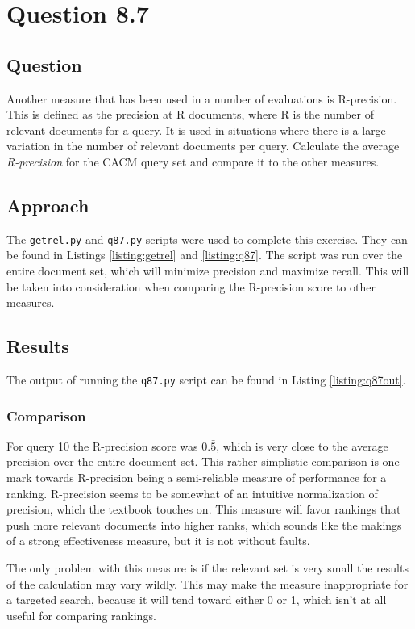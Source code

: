 \section{Question 8.7}

\subsection{Question}
Another measure that has been used in a number of evaluations is R-precision.  This is defined as the precision at R documents, where R is the number of relevant documents for a query. It is used in situations where there is a large variation in the number of relevant documents per query. Calculate the average \textit{R-precision} for the CACM query set and compare it to the other measures.

\subsection{Approach}
The \texttt{getrel.py} and \texttt{q87.py} scripts were used to complete this exercise.  They can be found in Listings \ref{listing:getrel} and \ref{listing:q87}.  The script was run over the entire document set, which will minimize precision and maximize recall.  This will be taken into consideration when comparing the R-precision score to other measures.

\subsection{Results}
The output of running the \texttt{q87.py} script can be found in Listing \ref{listing:q87out}.



\subsubsection{Comparison}
For query 10 the R-precision score was \(0.\bar5\), which is very close to the average precision over the entire document set.  This rather simplistic comparison is one mark towards R-precision being a semi-reliable measure of performance for a ranking.  R-precision seems to be somewhat of an intuitive normalization of precision, which the textbook touches on.  This measure will favor rankings that push more relevant documents into higher ranks, which sounds like the makings of a strong effectiveness measure, but it is not without faults.  

The only problem with this measure is if the relevant set is very small the results of the calculation may vary wildly.  This may make the measure inappropriate for a targeted search, because it will tend toward either 0 or 1, which isn't at all useful for comparing rankings.